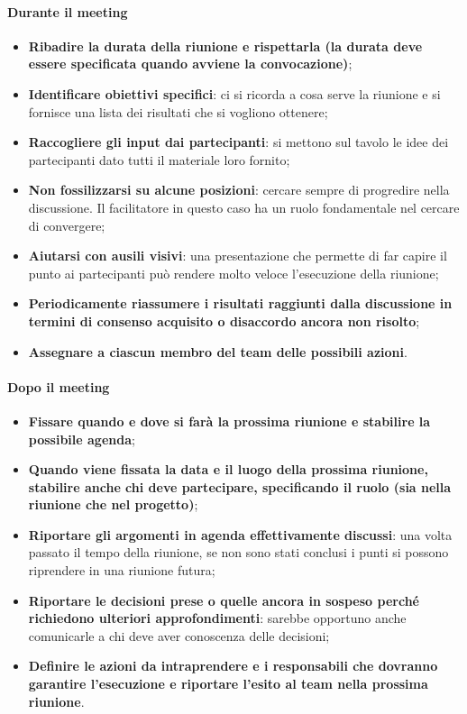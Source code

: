 \paragraph{Durante il meeting}
\begin{itemize}
	\item \textbf{Ribadire la durata della riunione e rispettarla (la durata deve essere specificata quando avviene la convocazione)};
	\item \textbf{Identificare obiettivi specifici}: ci si ricorda a cosa serve la riunione e si fornisce una lista dei risultati che si vogliono ottenere;
	\item \textbf{Raccogliere gli input dai partecipanti}: si mettono sul tavolo le idee dei partecipanti dato tutti il materiale loro fornito;
	\item \textbf{Non fossilizzarsi su alcune posizioni}: cercare sempre di progredire nella discussione. Il facilitatore in questo caso ha un ruolo fondamentale nel cercare di convergere;
	\item \textbf{Aiutarsi con ausili visivi}: una presentazione che permette di far capire il punto ai partecipanti può rendere molto veloce l'esecuzione della riunione;
	\item \textbf{Periodicamente riassumere i risultati raggiunti dalla discussione in termini di consenso acquisito o disaccordo ancora non risolto};
	\item \textbf{Assegnare a ciascun membro del team delle possibili azioni}.
\end{itemize}

\paragraph{Dopo il meeting}
\begin{itemize}
	\item \textbf{Fissare quando e dove si farà la prossima riunione e stabilire la possibile agenda};
	\item \textbf{Quando viene fissata la data e il luogo della prossima riunione, stabilire anche chi deve partecipare, specificando il ruolo (sia nella riunione che nel progetto)};
	\item \textbf{Riportare gli argomenti in agenda effettivamente discussi}: una volta passato il tempo della riunione, se non sono stati conclusi i punti si possono riprendere in una riunione futura;
	\item \textbf{Riportare le decisioni prese o quelle ancora in sospeso perché richiedono ulteriori approfondimenti}: sarebbe opportuno anche comunicarle a chi deve aver conoscenza delle decisioni;
	\item \textbf{Definire le azioni da intraprendere e i responsabili che dovranno garantire l’esecuzione e riportare l’esito al team nella prossima riunione}.
\end{itemize}

